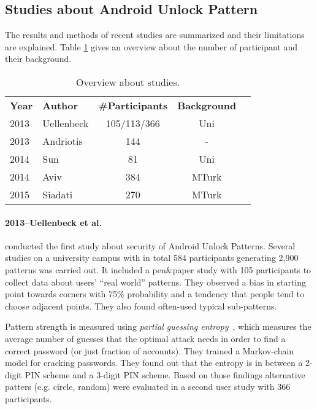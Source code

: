 \documentclass[twocolumn, a4paper, 10pt]{article}
\begin{document}
\subsection{Studies about Android Unlock Pattern}
\label{sec:relatedstudies}

The results and methods of recent studies are summarized and their limitations are explained. Table \ref{tab} gives an overview about the number of participant and their background.

\begin{table}[b]
	\small
	\centering

	\begin{tabular}{llccc}
		{\bf Year} & {\bf Author} & {\bf \#Participants} & {\bf Background} \\
		2013       & Uellenbeck       & 105/113/366    & Uni   \\
		2013       & Andriotis       & 144    & -  \\
		2014       & Sun     & 81  & Uni    \\
		2014       & Aviv       & 384  & MTurk     \\
		2015       & Siadati   & 270  & MTurk             
	\end{tabular}
			\caption{Overview about studies.}
			\label{tab}

\end{table}

\paragraph{2013--Uellenbeck et al. ~\cite{Uellenbeck:2013:QSG:2508859.2516700}}
conducted the first study about security of Android Unlock Patterns. Several studies on a university campus with in total 584 participants generating 2,900 patterns was carried out. It included a pen\&paper study with 105 participants to collect data about users' ``real world'' patterns. They observed a bias in starting point towards corners with 75\% probability and a tendency that people tend to choose adjacent points. They also found often-used typical sub-patterns.

Pattern strength is measured using \textit{partial guessing entropy}~\cite{bonneau2012science}, which measures the average number of guesses that the optimal attack needs in order to find a correct password (or just fraction of accounts). They trained a Markov-chain model for cracking passwords. They found out that the entropy is in between a 2-digit PIN scheme and a 3-digit PIN scheme. Based on those findings alternative patters (e.g. circle, random) were evaluated in a second user study with 366 participants.
\end{document}
